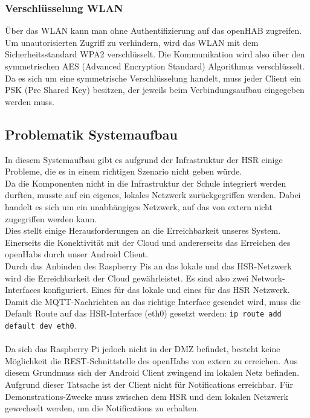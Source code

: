 \subsubsection{Verschlüsselung WLAN}
Über das WLAN kann man ohne Authentifizierung auf das openHAB zugreifen. Um unautorisierten Zugriff zu verhindern, wird das WLAN mit dem Sicherheitsstandard WPA2 verschlüsselt. Die Kommunikation wird also über den symmetrischen AES (Advanced Encryption Standard) Algorithmus verschlüsselt. Da es sich um eine symmetrische Verschlüsselung handelt, muss jeder Client ein PSK (Pre Shared Key) besitzen, der jeweils beim Verbindungsaufbau eingegeben werden muss.

\subsection{Problematik Systemaufbau}
In diesem Systemaufbau gibt es aufgrund der Infrastruktur der HSR einige Probleme, die es in einem richtigen Szenario nicht geben würde. \\
Da die Komponenten nicht in die Infrastruktur der Schule integriert werden durften, musste auf ein eigenes, lokales Netzwerk zurückgegriffen werden. Dabei handelt es sich um ein unabhängiges Netzwerk, auf das von extern nicht zugegriffen werden kann. \\
Dies stellt einige Herausforderungen an die Erreichbarkeit unseres System. Einerseits die Konektivität mit der Cloud und andererseits das Erreichen des openHabs durch unser Android Client. \\
Durch das Anbinden des Raspberry Pis an das lokale und das HSR-Netzwerk wird die Erreichbarkeit der Cloud gewährleistet. Es sind also zwei Network-Interfaces konfiguriert. Eines für das lokale und eines für das HSR Netzwerk. Damit die MQTT-Nachrichten an das richtige Interface gesendet wird, muss die Default Route auf das HSR-Interface (eth0) gesetzt werden: \lstinline!ip route add default dev eth0!. \\\\
Da sich das Raspberry Pi jedoch nicht in der DMZ befindet, besteht keine Möglichkeit die REST-Schnittstelle des openHabs von extern zu erreichen. Aus diesem Grundmuss sich der Android Client zwingend im lokalen Netz befinden. \\
Aufgrund dieser Tatsache ist der Client nicht für Notifications erreichbar. Für Demonstrations-Zwecke muss zwischen dem HSR und dem lokalen Netzwerk gewechselt werden, um die Notifications zu erhalten.




